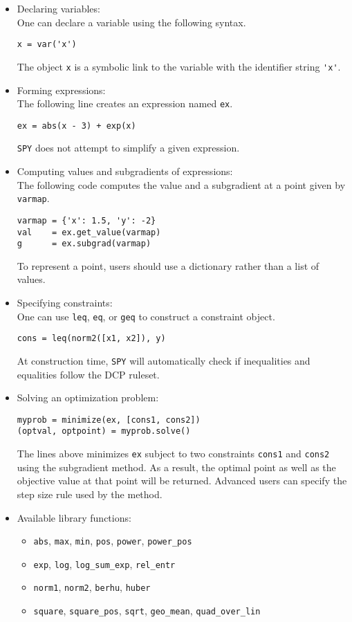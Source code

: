 \begin{itemize}
\item Declaring variables: \\
One can declare a variable using the following syntax.
\begin{verbatim}
x = var('x')
\end{verbatim}
The object \verb'x' is a symbolic link to the variable with the identifier string \verb,'x',.
\item Forming expressions: \\
The following line creates an expression named \verb'ex'.
\begin{verbatim}
ex = abs(x - 3) + exp(x)
\end{verbatim}
\verb'SPY' does not attempt to simplify a given expression.
\item Computing values and subgradients of expressions: \\
The following code computes the value and a subgradient at a point given by \verb'varmap'.
\begin{verbatim}
varmap = {'x': 1.5, 'y': -2}
val    = ex.get_value(varmap)
g      = ex.subgrad(varmap)
\end{verbatim}
To represent a point, users should use a dictionary rather than a list of values.
\item Specifying constraints: \\
One can use \verb'leq', \verb'eq', or \verb'geq' to construct a constraint object.
\begin{verbatim}
cons = leq(norm2([x1, x2]), y)
\end{verbatim}
At construction time, \verb'SPY' will automatically check if inequalities and equalities follow the DCP ruleset.
\item Solving an optimization problem:
\begin{verbatim}
myprob = minimize(ex, [cons1, cons2])
(optval, optpoint) = myprob.solve()
\end{verbatim}
The lines above minimizes \verb'ex' subject to two constraints \verb'cons1' and \verb'cons2' using the subgradient method. As a result, the optimal point as well as the objective value at that point will be returned. Advanced users can specify the step size rule used by the method.
\item Available library functions:
\begin{itemize}
\item \verb'abs', \verb'max', \verb'min', \verb'pos', \verb'power', \verb'power_pos'
\item \verb'exp', \verb'log', \verb'log_sum_exp', \verb'rel_entr'
\item \verb'norm1', \verb'norm2', \verb'berhu', \verb'huber'
\item \verb'square', \verb'square_pos', \verb'sqrt', \verb'geo_mean', \verb'quad_over_lin'
\end{itemize}
\end{itemize}
